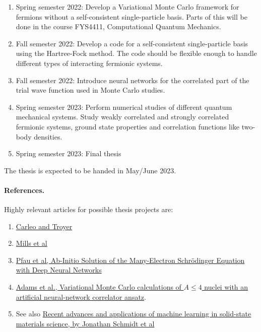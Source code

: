 \documentclass[%
oneside,                 %
final,                   %
10pt]{article}
\begin{document}
\begin{enumerate}
\item Spring semester 2022: Develop a Variational Monte Carlo framework for fermions without a self-consistent single-particle basis. Parts of this will be done in the course FYS4411, Computational Quantum Mechanics.

\item Fall semester 2022: Develop a code for a self-consistent single-particle basis using the Hartree-Fock method. The code should be flexible enough to handle different types of interacting  fermionic systems.

\item Fall semester 2022: Introduce neural networks for the correlated part of the trial wave function used in Monte Carlo studies.

\item Spring semester 2023: Perform numerical studies of different quantum mechanical systems. Study weakly correlated and strongly correlated fermionic systems, ground state properties and correlation functions like two-body densities.

\item Spring semester 2023: Final thesis
\end{enumerate}

\noindent
The thesis is expected to be handed in May/June  2023.

\paragraph{References.}
Highly relevant articles for possible thesis projects are:

\begin{enumerate}
\item \href{{http://science.sciencemag.org/content/355/6325/602}}{Carleo and Troyer} 

\item \href{{https://journals.aps.org/pra/abstract/10.1103/PhysRevA.96.042113}}{Mills et al} 

\item \href{{https://arxiv.org/abs/1909.02487}}{Pfau et al, Ab-Initio Solution of the Many-Electron Schrödinger Equation with Deep Neural Networks}

\item \href{{https://arxiv.org/abs/2007.14282}}{Adams et al., Variational Monte Carlo calculations of $A\le 4$  nuclei with an artificial neural-network correlator ansatz}.

\item See also \href{{https://www.nature.com/articles/s41524-019-0221-0}}{Recent advances and applications of machine learning in solid-state materials science, by  Jonathan Schmidt et al}
\end{enumerate}

\noindent

\end{document}
